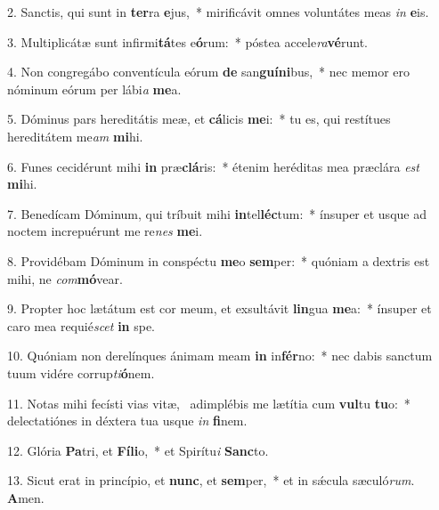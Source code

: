 2. Sanctis, qui sunt in \textbf{ter}ra \textbf{e}jus,~*  mirificávit omnes voluntátes meas \textit{in} \textbf{e}is.\

3. Multiplicátæ sunt infirmi\textbf{tá}tes e\textbf{ó}rum:~*  póstea accele\textit{ra}\textbf{vé}runt.\

4. Non congregábo conventícula eórum \textbf{de} san\textbf{guí}\textbf{ni}bus,~*  nec memor ero nóminum eórum per lábi\textit{a} \textbf{me}a.\

5. Dóminus pars hereditátis meæ, et \textbf{cá}licis \textbf{me}i:~*  tu es, qui restítues hereditátem me\textit{am} \textbf{mi}hi.\

6. Funes cecidérunt mihi \textbf{in} præ\textbf{clá}ris:~*  étenim heréditas mea præclára \textit{est} \textbf{mi}hi.\

7. Benedícam Dóminum, qui tríbuit mihi \textbf{in}tel\textbf{léc}tum:~*  ínsuper et usque ad noctem increpuérunt me re\textit{nes} \textbf{me}i.\

8. Providébam Dóminum in conspéctu \textbf{me}o \textbf{sem}per:~*  quóniam a dextris est mihi, ne \textit{com}\textbf{mó}vear.\

9. Propter hoc lætátum est cor meum, et exsultávit \textbf{lin}gua \textbf{me}a:~*  ínsuper et caro mea requié\textit{scet} \textbf{in} spe.\

10. Quóniam non derelínques ánimam meam \textbf{in} in\textbf{fér}no:~*  nec dabis sanctum tuum vidére corrup\textit{ti}\textbf{ó}nem.\

11. Notas mihi fecísti vias vitæ, \dag\  adimplébis me lætítia cum \textbf{vul}tu \textbf{tu}o:~*  delectatiónes in déxtera tua usque \textit{in} \textbf{fi}nem.\

12. Glória \textbf{Pa}tri, et \textbf{Fí}\textbf{li}o,~*  et Spirítu\textit{i} \textbf{Sanc}to.\

13. Sicut erat in princípio, et \textbf{nunc}, et \textbf{sem}per,~*  et in sǽcula sæculó\textit{rum}. \textbf{A}men.\

